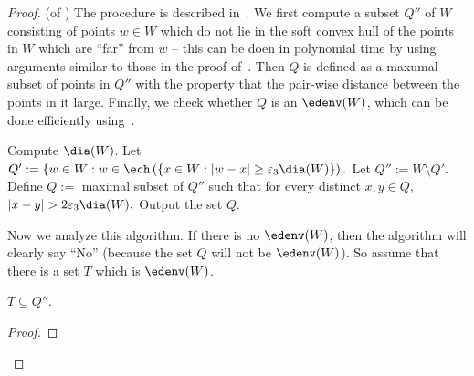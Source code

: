 \begin{proof} (of )
The procedure is described  in~. We first compute a subset $Q''$ of $W$ consisting of points $w \in W$ which do not lie in the soft convex hull of the points in $W$ which are ``far'' from $w$ -- this can be doen in polynomial time by using arguments similar to those in the proof of~. Then $Q$ is defined as a maxumal subset of points in $Q''$ with the property that the pair-wise distance between the points in it large. Finally, we check whether $Q$ is an $\edenv(W)$, which can be done efficiently using~. 


\begin{algorithm}[H]
  \caption{Procedure to identify $\edenv(W)$}
  \label{algo:main}
    Compute $\dia(W)$. \;
    Let $Q' := \{w \in W: w \in \ech \left(\{x \in W: |w-x| \geq \varepsilon_3 \dia(W) \}\right). $ \;
    Let $Q'' := W \setminus Q'$. \;
    Define $Q :=$ maximal subset of $Q''$ such that for every distinct $x,y \in Q$, $|x-y| > 2\varepsilon_3 \dia(W). $ \;
     {
       Output  the set $Q$. \; }
\end{algorithm}


Now we analyze this algorithm. If there is no $\edenv(W)$, then the algorithm will clearly say ``No'' (because the set $Q$ will not be $\edenv(W)$). So assume that there is a set $T$ which is $\edenv(W)$. 

\begin{claim}
\label{cl:ed}
$T \subseteq Q''$. 
\end{claim}
\begin{proof}


\end{proof}
\end{proof}
